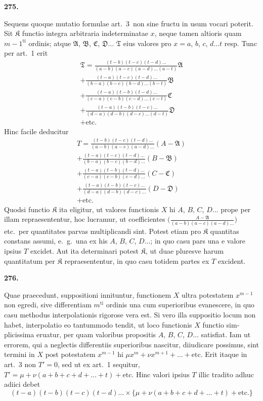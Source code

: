 \documentclass[12pt,a4paper]{article}
\begin{document}
\newpage
\noindent\textbf{275.}

\smallskip\noindent
Sequens quoque mutatio formulae art.\ 3\ non sine fructu in usum vocari
poterit. Sit $\mathfrak{K}$ functio integra arbitraria indeterminatae $x$, neque tamen altioris
quam $m-1^{\mathrm{ti}}$ ordinis; atque $\mathfrak{A}$, $\mathfrak{B}$, $\mathfrak{C}$, $\mathfrak{D}\dots$ $\mathfrak{T}$ eius valores pro $x=a$, $b$, $c$, $d\dots t$
resp. Tunc per art.\ 1 erit
\begin{multline*}
\mathfrak{T} =
\frac{(t-b)(t-c)(t-d)\dots}{(a-b)(a-c)(a-d)\dots(a-t)}\mathfrak{A}\\
+ \frac{(t-a)(t-c)(t-d)\dots}{(b-a)(b-c)(b-d)\dots(b-t)}\mathfrak{B}\\
+ \frac{(t-a)(t-b)(t-d)\dots}{(c-a)(c-b)(c-d)\dots(c-t)}\mathfrak{C}\\
+ \frac{(t-a)(t-b)(t-c)\dots}{(d-a)(d-b)(d-c)\dots(d-t)}\mathfrak{D}\\
+ \text{etc.}
\end{multline*}
Hinc facile deducitur
\begin{multline*}
T = \frac{(t-b)(t-c)(t-d)\dots}{(a-b)(a-c)(a-d)\dots}(A-\mathfrak{A})\\
+ \frac{(t-a)(t-c)(t-d)\dots}{(b-a)(b-c)(b-d)\dots}(B-\mathfrak{B})\\
+ \frac{(t-a)(t-b)(t-d)\dots}{(c-a)(c-b)(c-d)\dots}(C-\mathfrak{C})\\
+ \frac{(t-a)(t-b)(t-c)\dots}{(d-a)(d-b)(d-c)\dots}(D-\mathfrak{D})\\
+ \text{etc.}
\end{multline*}
Quodsi functio $\mathfrak{K}$ ita eligitur, ut valores functionis $X$ hi $A$, $B$, $C$, $D\dots$ prope
per illam repraesententur, hoc lucramur, ut coefficientes $\bigl(\frac{A-\mathfrak{A}}{(a-b)(a-c)(a-d)\dots}\bigr)$ etc.\ per quantitates parvas multiplicandi sint. Potest etiam pro $\mathfrak{K}$ quantitas constans
assumi, e.~g.\ una ex his $A$, $B$, $C$, $D\dots$; in quo casu pars una e valore ipsius
$T$ excidet. Aut ita determinari potest $\mathfrak{K}$, ut duae pluresve harum quantitatum
per $\mathfrak{K}$ repraesententur, in quo casu totidem partes ex $T$ excident.

\newpage
\noindent\textbf{276.}

\smallskip\noindent
Quae praecedunt, suppositioni innituntur, functionem $X$ ultra potestatem
$x^{m-1}$ non egredi, sive differentiam $m^{\mathrm{ti}}$ ordinis una cum superioribus evanescere, in
quo casu methodus interpolationis rigorose vera est. Si vero illa suppositio locum
non habet, interpolatio eo tantummodo tendit, ut loco functionis $X$ functio sim-
plicissima eruatur, per quam valoribus propositis $A$, $B$, $C$, $D\dots$ satisfiat. Iam
ut errorem, qui a neglectis differentiis superioribus nascitur, diiudicare possimus,
sint termini in $X$ post potestatem $x^{m-1}$ hi $\mu x^m + \nu x^{m+1} + \dots + \text{etc.}$ Erit itaque in art.\ 3
non $T'=0$, sed ut ex art.\ 1 sequitur, $T' = \mu + \nu(a+b+c+d+\dots+t) + \text{etc.}$
Hinc valori ipsius $T$ illic tradito adhuc adiici debet
\begin{equation*}
(t-a)(t-b)(t-c)(t-d)\dots \times \bigl\{\mu + \nu(a+b+c+d+\dots+t) + \text{etc.}\bigr\}
\end{equation*}
\end{document}
